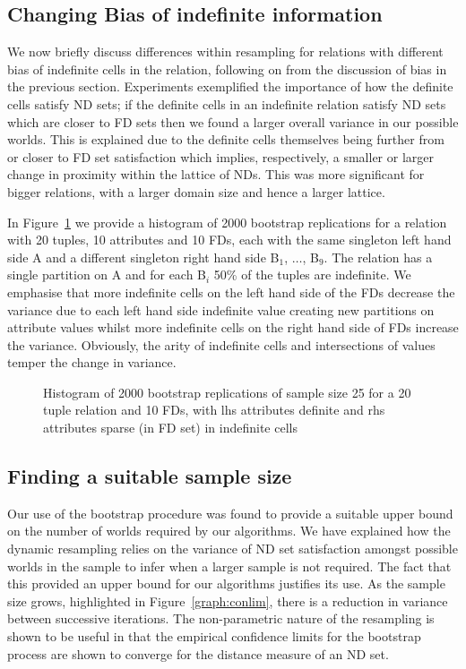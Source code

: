 \subsection{Changing Bias of indefinite information}\label{subsec:cp_bias}
We now briefly discuss differences within resampling for relations
with different bias of indefinite cells in the relation, following on
from the discussion of bias in the previous section. 
Experiments exemplified the importance of how the definite cells
satisfy ND sets; if the definite cells in an indefinite relation
satisfy ND sets which are closer to FD sets then we found a larger
overall variance in our possible worlds.
This is
explained due to the definite cells themselves being further from or
closer to FD set satisfaction which implies, respectively, a smaller
or larger change in proximity within the lattice of NDs. This was
more significant for bigger relations, with a larger domain size and
hence a larger lattice.

\smallskip

In Figure~\ref{graph:cp_hist1} we provide a histogram of
2000 bootstrap replications for a relation with 20 tuples, 
10 attributes and 10 FDs, each with the same singleton left hand side A
and a different singleton right hand side B$_1$, $\ldots$, B$_9$.
The relation has a single partition on A and for each B$_i$ 50\% of
the tuples are indefinite.
We emphasise that more indefinite cells on the left hand side of the
FDs decrease the variance due to each left hand side indefinite value creating
new partitions on attribute values whilst more indefinite cells
on the right hand side of FDs increase the variance. Obviously, the arity of
indefinite cells and intersections of values temper the change in
variance. 


\begin{figure}
\centerline{}
\caption{\label{graph:cp_hist1} {Histogram of 2000 bootstrap
replications of sample size 25 for a 20 tuple relation and 10 FDs,
with lhs attributes definite and rhs attributes sparse (in FD set) in
indefinite cells}} 
\end{figure}


\subsection{Finding a suitable sample size}

Our use of the bootstrap procedure was found to provide a suitable
upper bound on the number of worlds required by our algorithms. We
have explained how the dynamic resampling relies on the variance of ND
set satisfaction amongst possible worlds in the sample to infer when a
larger sample is not required.  The fact that this provided an upper
bound for our algorithms justifies its use. 
As the sample size grows, highlighted in
Figure~\ref{graph:conlim}, there is a reduction in variance between
successive iterations. The non-parametric nature of the resampling is
shown to be useful in that the empirical confidence limits for
the bootstrap process are
shown to converge for the distance measure of an ND set.


